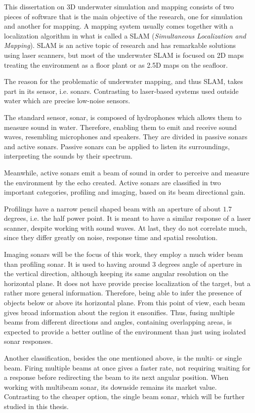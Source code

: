 This dissertation on 3D underwater simulation and mapping consists of two pieces
of software that is the main objective of the research, one for simulation and
another for mapping. A mapping system usually comes together with a localization
algorithm in what is called a SLAM (\textit{Simultaneous Localization and
Mapping}). SLAM is an active topic of research and has remarkable solutions
using laser scanners,
but most of the underwater SLAM is focused on 2D maps treating the environment
as a floor plant or as 2.5D maps on the seafloor.

The reason for the problematic of underwater mapping, and thus SLAM, takes part
in its sensor, i.e. sonars. Contrasting to laser-based systems used outside
water which are precise low-noise sensors.

The standard sensor, sonar, is composed of hydrophones which allows them to
measure sound in water. Therefore, enabling them to emit and receive sound
waves, resembling microphones and speakers. They are divided in passive sonars
and active sonars. Passive sonars can be applied to listen its surroundings,
interpreting the sounds by their spectrum.

Meanwhile, active sonars emit a beam of sound in order to perceive  and measure
the environment by the echo created. Active sonars are classified in two
important categories, profiling and imaging, based on its beam directional gain.

Profilings have a narrow pencil shaped beam  with an aperture of about $1.7$
degrees, i.e. the half power point. It is meant to have a similar response of a
laser scanner, despite working with sound waves. At last, they do not correlate
much, since they differ greatly on noise, response time and
spatial resolution.

Imaging sonars will be the focus of this work, they  employ a much wider beam
than profiling sonar. It is used to having around $3$ degrees angle of aperture
in the vertical direction, although keeping its same angular resolution on the
horizontal plane.
It does not have provide precise localization of the target, but a rather more
general information. Therefore, being able to infer the presence of objects
below or above its horizontal plane.
From this point of view, each beam gives broad  information about the region it
ensonifies. Thus, fusing multiple beams from different directions and angles,
containing overlapping areas,  is expected to provide a better outline of the
environment than just using isolated sonar responses.

Another classification, besides the one mentioned above, is the multi- or single
beam. Firing multiple beams at once gives a faster rate, not requiring waiting
for a response before redirecting the beam to its next angular position. When
working with multibeam sonar, its downside remains its market value. Contrasting
to the cheaper option, the single beam sonar, which will be further studied in
this thesis.